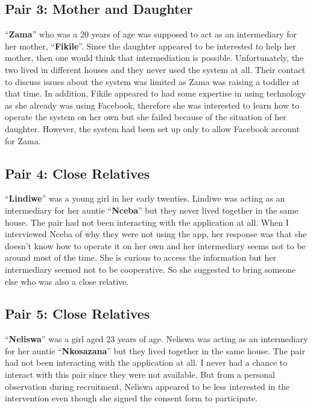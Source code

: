 \subsection*{\textbf{Pair 3: Mother and Daughter}}
``\textbf{Zama}'' who was a 20 years of age was supposed to act as an intermediary for her mother, ``\textbf{Fikile}''. Since the daughter appeared to be interested to help her mother, then one would think that intermediation is possible. Unfortunately, the two lived in different houses and they never used the system at all. Their contact to discuss issues about the system was limited as Zama was raising a toddler at that time. In addition, Fikile appeared to had some expertise in using technology as she already was using Facebook, therefore she was interested to learn how to operate the system on her own but she failed because of the situation of her daughter. However, the system had been set up only to allow Facebook account for Zama. 
\subsection*{\textbf{Pair 4: Close Relatives}}
``\textbf{Lindiwe}'' was a young girl in her early twenties. Lindiwe was acting as an intermediary for her auntie ``\textbf{Nceba}'' but they never lived together in the same house. The pair had not been interacting with the application at all. When I interviewed Nceba of why they were not using the app, her response was that she doesn't know how to operate it on her own and her intermediary seems not  to be around most of the time. She is curious to access the information but her intermediary seemed not to be cooperative. So she suggested to bring someone else who was also a close relative.
\subsection*{\textbf{Pair 5: Close Relatives}}
``\textbf{Neliswa}'' was a girl aged 23 years of age. Neliswa  was acting as an intermediary for her auntie ``\textbf{Nkosazana}'' but they lived together in the same house. The pair had not been interacting with the application at all. I never had a chance to interact with this pair since they were not available. But from a personal observation during recruitment, Neliswa appeared to be less interested in the intervention even though she signed the consent form to participate. 
